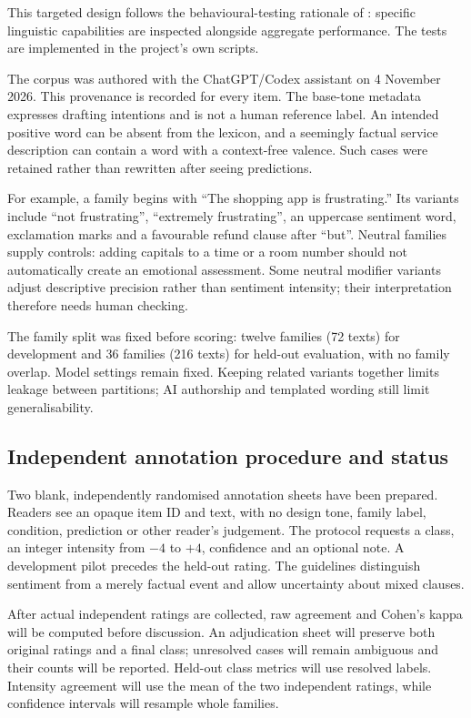 \documentclass[11pt]{article}
\begin{document}
This targeted design follows the behavioural-testing rationale of
\citet{ribeiro2020checklist}: specific linguistic capabilities are inspected
alongside aggregate performance. The tests are implemented in the project's
own scripts.

The corpus was authored with the ChatGPT/Codex assistant on 4 November 2026.
This provenance is recorded for every item. The base-tone metadata expresses
drafting intentions and is not a human reference label. An intended positive word
can be absent from the lexicon, and a seemingly factual service description can
contain a word with a context-free valence. Such cases were retained rather than
rewritten after seeing predictions.

For example, a family begins with ``The shopping app is frustrating.'' Its
variants include ``not frustrating'', ``extremely frustrating'', an uppercase
sentiment word, exclamation marks and a favourable refund clause after
``but''. Neutral families supply controls: adding capitals to a time or a room
number should not automatically create an emotional assessment. Some neutral
modifier variants adjust descriptive precision rather than sentiment intensity;
their interpretation therefore needs human checking.

The family split was fixed before scoring: twelve families (72 texts) for
development and 36 families (216 texts) for held-out evaluation, with no family
overlap. Model settings remain fixed. Keeping related variants together limits
leakage between partitions; AI authorship and templated wording still limit
generalisability.

\subsection{Independent annotation procedure and status}
Two blank, independently randomised annotation sheets have been prepared.
Readers see an opaque item ID and text, with no design tone, family label,
condition, prediction or other reader's judgement. The protocol requests a class,
an integer intensity from $-4$ to $+4$, confidence and an optional note. A
development pilot precedes the held-out rating. The guidelines distinguish
sentiment from a merely factual event and allow uncertainty about mixed clauses.

After actual independent ratings are collected, raw agreement and Cohen's kappa
\citep{cohen1960agreement} will be computed before discussion. An adjudication sheet will preserve both
original ratings and a final class; unresolved cases will remain ambiguous and
their counts will be reported. Held-out class metrics will use resolved labels.
Intensity agreement will use the mean of the two independent ratings, while
confidence intervals will resample whole families.
\end{document}
